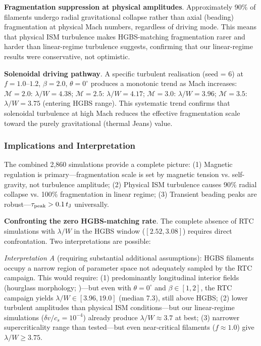 \documentclass[twocolumn]{mnras}
\begin{document}
\textbf{Fragmentation suppression at physical amplitudes}. Approximately 90\% of filaments undergo radial gravitational collapse rather than axial (beading) fragmentation at physical Mach numbers, regardless of driving mode. This means that physical ISM turbulence makes HGBS-matching fragmentation rarer and harder than linear-regime turbulence suggests, confirming that our linear-regime results were conservative, not optimistic.

\textbf{Solenoidal driving pathway}. A specific turbulent realisation (seed = 6) at $f = 1.0$--$1.2$, $\beta = 2.0$, $\theta = 0^{\circ}$ produces a monotonic trend as Mach increases: $\mathcal{M} = 2.0$: $\lambda/W = 4.38$; $\mathcal{M} = 2.5$: $\lambda/W = 4.17$; $\mathcal{M} = 3.0$: $\lambda/W = 3.96$; $\mathcal{M} = 3.5$: $\lambda/W = 3.75$ (entering HGBS range). This systematic trend confirms that solenoidal turbulence at high Mach reduces the effective fragmentation scale toward the purely gravitational (thermal Jeans) value.

\subsubsection{Implications and Interpretation}

The combined 2,860 simulations provide a complete picture: (1) Magnetic regulation is primary—fragmentation scale is set by magnetic tension vs. self-gravity, not turbulence amplitude; (2) Physical ISM turbulence causes 90\% radial collapse vs. 100\% fragmentation in linear regime; (3) Transient beading peaks are robust—$\tau_{\rm peak} > 0.1\,t_{\rm J}$ universally.

\textbf{Confronting the zero HGBS-matching rate}. The complete absence of RTC simulations with $\lambda/W$ in the HGBS window ($[2.52, 3.08]$) requires direct confrontation. Two interpretations are possible:

\textit{Interpretation A} (requiring substantial additional assumptions): HGBS filaments occupy a narrow region of parameter space not adequately sampled by the RTC campaign. This would require: (1) predominantly longitudinal interior fields (hourglass morphology; \citet{Jadhav2026})—but even with $\theta = 0^{\circ}$ and $\beta \in [1, 2]$, the RTC campaign yields $\lambda/W \in [3.96, 19.0]$ (median 7.3), still above HGBS; (2) lower turbulent amplitudes than physical ISM conditions—but our linear-regime simulations ($\delta v/c_s = 10^{-4}$) already produce $\lambda/W \approx 3.7$ at best; (3) narrower supercriticality range than tested—but even near-critical filaments ($f \approx 1.0$) give $\lambda/W \geq 3.75$.
\end{document}
